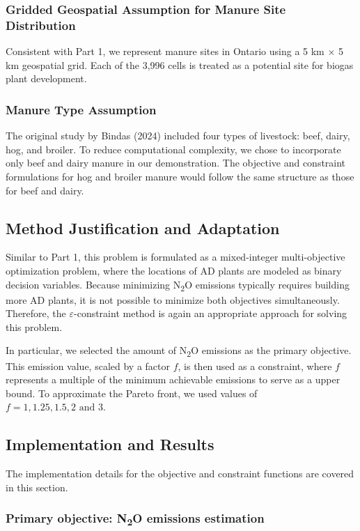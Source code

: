 \documentclass[12pt]{article}
\begin{document}
\subsubsection*{Gridded Geospatial Assumption for Manure Site Distribution}
Consistent with Part 1, we represent manure sites in Ontario using a 5 km × 5 km geospatial grid. Each of the 3,996 cells is treated as a potential site for biogas plant development.

\subsubsection*{Manure Type Assumption}
The original study by Bindas (2024) included four types of livestock: beef, dairy, hog, and broiler. To reduce computational complexity, we chose to incorporate only beef and dairy manure in our demonstration. The objective and constraint formulations for hog and broiler manure would follow the same structure as those for beef and dairy.

\subsection{Method Justification and Adaptation}
Similar to Part 1, this problem is formulated as a mixed-integer multi-objective optimization problem, where the locations of AD plants are modeled as binary decision variables. Because minimizing N\textsubscript{2}O emissions typically requires building more AD plants, it is not possible to minimize both objectives simultaneously. Therefore, the $\varepsilon$-constraint method is again an appropriate approach for solving this problem.

In particular, we selected the amount of N\textsubscript{2}O emissions as the primary objective. This emission value, scaled by a factor $f$, is then used as a constraint, where $f$ represents a multiple of the minimum achievable emissions to serve as a upper bound. To approximate the Pareto front, we used values of $f=1, 1.25, 1.5, 2 \text{ and } 3$.

\subsection{Implementation and Results}
The implementation details for the objective and constraint functions are covered in this section.

\subsubsection*{Primary objective: N\textsubscript{2}O emissions estimation}
\end{document}
